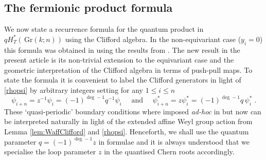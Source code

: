 \documentclass[12pt]{amsart}
\newcommand{\Gr}{\,\mathrm{Gr}}
\newcommand{\op}[1]{\operatorname{#1}}
\numberwithin{equation}{section}
\numberwithin{figure}{section}
\begin{document}
\subsection{The fermionic product formula}
We now state a recurrence formula for the quantum product in $qH^*_T(\Gr(k;n))$ using the Clifford algebra. In the non-equivariant case ($y_i=0$) this formula was obtained in \cite[Eq (1.5) and Thm 1.3]{Korff09} using the results from \cite[Section 11]{korffstroppel2010}. The new result in the present article is its non-trivial extension to the equivariant case and the geometric interpretation of the Clifford algebra in terms of push-pull maps. To state the formula it is convenient to label the Clifford generators in light of \eqref{rhopsi} by arbitrary integers setting for any $1 \leq i \leq n$ 
\begin{equation}\label{quasiperiod}
    \psi_{i + n} = z^{-1}\psi_i=(-1)^{\op{deg}-1}q^{-1} \psi_i\quad\text{ and }
    \quad \psi^*_{i + n} =z\psi^*_i= (-1)^{\op{deg}-1}q\, \psi^*_i\;.
\end{equation}
These `quasi-periodic' boundary conditions where imposed {\em ad-hoc} in \cite{korffstroppel2010,Korff09} but now can be interpreted naturally in light of the extended affine Weyl group action from Lemma \ref{lem:WaffClifford} and \eqref{rhopsi}. Henceforth, we shall use the quantum parameter $q=(-1)^{\op{deg}-1}z$ in formulae and it is always understood that we specialise the loop parameter $z$ in the quantised Chern roots accordingly.
\end{document}
